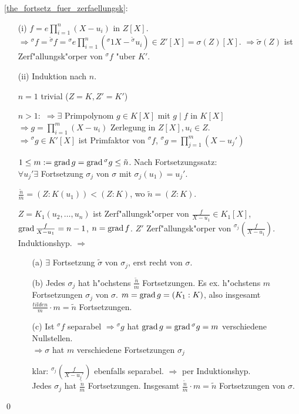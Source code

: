 \proof\ref{the_fortsetz_fuer_zerfaellungsk}:{\begin{enumerate}
   \item[(i)] $f=e\prod_{i=1}^{n}(X-u_i)$ in $Z[X]$. $\Rightarrow {}^{\sigma}f=
   {}^{\tilde{\sigma}}f={}^{\sigma}e\prod_{i=1}^{n}({}^{\sigma} 1 X-{}^{\tilde{\sigma}}u_i)\in Z'[X]=\sigma(Z)[X]$.
   $\Rightarrow \tilde{\sigma}(Z)$ ist Zerf"allungsk"orper von ${}^{\sigma}f$ "uber $K'$.
   \item[(ii)] Induktion nach $n$.
   
   $n=1$ trivial ($Z=K, Z'=K'$)
   
   $n>1:$ $\Rightarrow \exists$ Primpolynom $g\in K[X]$ mit $g\mid f$ in $K[X]$\\
   $\Rightarrow g=\prod_{i=1}^{m}(X-u_i)$ Zerlegung in $Z[X], u_i\in Z$.\\
   $\Rightarrow {}^{\sigma}g \in K'[X]$ ist Primfaktor von ${}^{\sigma}f$,
   ${}^{\sigma}g=\prod_{j=1}^{m}(X-u_j')$
   
   $1\leq m:=\operatorname{grad} g=\operatorname{grad}{}^{\sigma}g\leq \tilde{n}$. Nach Fortsetzungssatz: \\
   $\forall u_j'  \exists$ Fortsetzung $\sigma_j$ von $\sigma$ mit $\sigma_j(u_1)=u_j'$.
   
   $\frac{\tilde{n}}{m}=(Z:K(u_1))<(Z:K)$, wo $\tilde{n}=(Z:K)$.
   
   $Z=K_1(u_2, \ldots, u_n)$ ist Zerf"allungsk"orper von $\frac{f}{X-u_1}\in K_1[X]$,
   $\operatorname{grad}\frac{f}{X-u_1}=n-1$, $n=\operatorname{grad} f$.
   $Z'$ Zerf"allungsk"orper von ${}^{\sigma_j}(\frac{f}{X-u_1})$.
   Induktionshyp. $\Rightarrow$
   \begin{enumerate}
     \item[(a)] $\exists$ Fortsetzung $\tilde{\sigma}$ von $\sigma_j$, erst recht von $\sigma$.
	 \item[(b)] Jedes $\sigma_j$ hat h"ochstens $\frac{\tilde{n}}{m}$ Fortsetzungen. Es ex. h"ochstens
	 $m$ Fortsetzungen $\sigma_j$ von $\sigma$. $m=\operatorname{grad} g=(K_1:K)$, also insgesamt 
	 $\frac{tilde{n}}{m}\cdot m=\tilde{n}$ Fortsetzungen.
	 \item[(c)] Ist ${}^{\sigma}f$ separabel $\Rightarrow {}^{\sigma}g$ hat $\operatorname{grad} g=\operatorname{grad}
	 {}^{\sigma}g=m$ verschiedene Nullstellen.\\
	 $\Rightarrow \sigma$ hat $m$ verschiedene Fortsetzungen $\sigma_j$ 
	 
	 klar: ${}^{\sigma_j}(\frac{f}{X-u_j'})$ ebenfalls separabel. $\Rightarrow$ per Induktionshyp.\\
	 Jedes $\sigma_j$ hat $\frac{\tilde{n}}{m}$ Fortsetzungen. Insgesamt $\frac{\tilde{n}}{m}\cdot m=\tilde{n}$
	 Fortsetzungen von $\sigma$. 
   \end{enumerate}
  \end{enumerate}
  \qed}
